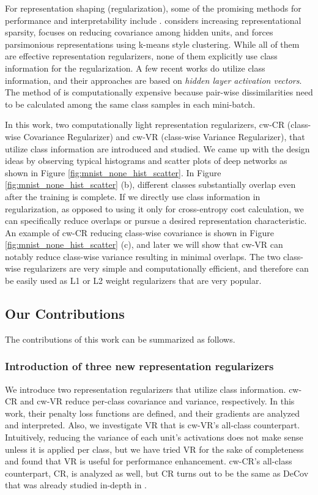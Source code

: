 For representation shaping (regularization), some of the promising methods for performance and interpretability include \cite{glorot2011deep,cogswell2015reducing,liao2016learning}.
\cite{glorot2011deep} considers increasing representational sparsity, \cite{cogswell2015reducing} focuses on reducing covariance among hidden units, and \cite{liao2016learning} forces parsimonious representations using k-means style clustering. While all of them are effective representation regularizers, none of them explicitly use class information for the regularization. A few recent works \cite{wen2016discriminative,belharbi2017neural,yang2018robust} do utilize class information, and their approaches are based on \textit{hidden layer activation vectors}. The method of \cite{belharbi2017neural} is computationally expensive because pair-wise dissimilarities need to be calculated among the same class samples in each mini-batch. 

In this work, two computationally light representation regularizers, cw-CR (class-wise Covariance Regularizer) and cw-VR (class-wise Variance Regularizer), that utilize class information are introduced and studied. We came up with the design ideas by observing typical histograms and scatter plots of deep networks as shown in Figure \ref{fig:mnist_none_hist_scatter}. In Figure \ref{fig:mnist_none_hist_scatter} (b), different classes substantially overlap even after the training is complete. If we directly use class information in regularization, as opposed to using it only for cross-entropy cost calculation, we can specifically reduce overlaps or pursue a desired representation characteristic. An example of cw-CR reducing class-wise covariance is shown in Figure \ref{fig:mnist_none_hist_scatter} (c), and later we will show that cw-VR can notably reduce class-wise variance resulting in minimal overlaps. The two class-wise regularizers are very simple and computationally efficient, and therefore can be easily used as L1 or L2 weight regularizers that are very popular. 

\subsection{Our Contributions}
The contributions of this work can be summarized as follows.

\subsubsection{Introduction of three new representation regularizers} 
We introduce two representation regularizers that utilize class information. cw-CR and cw-VR reduce per-class covariance and variance, respectively. In this work, their penalty loss functions are defined, and their gradients are analyzed and interpreted. Also, we investigate VR that is cw-VR's all-class counterpart. Intuitively, reducing the variance of each unit's activations does not make sense unless it is applied per class, but we have tried VR for the sake of completeness and found that VR is useful for performance enhancement. cw-CR's all-class counterpart, CR, is analyzed as well, but CR turns out to be the same as DeCov that was already studied in-depth in \cite{cogswell2015reducing}. 

